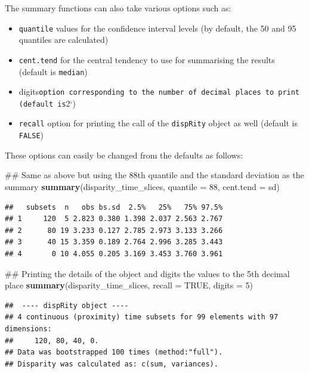 \documentclass[]{book}
\newenvironment{Shaded}{\begin{snugshade}}{\end{snugshade}}
\newcommand{\KeywordTok}[1]{\textcolor[rgb]{0.13,0.29,0.53}{\textbf{#1}}}
\newcommand{\DataTypeTok}[1]{\textcolor[rgb]{0.13,0.29,0.53}{#1}}
\newcommand{\DecValTok}[1]{\textcolor[rgb]{0.00,0.00,0.81}{#1}}
\newcommand{\OtherTok}[1]{\textcolor[rgb]{0.56,0.35,0.01}{#1}}
\newcommand{\NormalTok}[1]{#1}
\providecommand{\tightlist}{%
  \setlength{\itemsep}{0pt}\setlength{\parskip}{0pt}}
\theoremstyle{definition}
\theoremstyle{definition}
\theoremstyle{remark}
\begin{document}
The summary functions can also take various options such as:

\begin{itemize}
\tightlist
\item
  \texttt{quantile} values for the confidence interval levels (by
  default, the 50 and 95 quantiles are calculated)
\item
  \texttt{cent.tend} for the central tendency to use for summarising the
  results (default is \texttt{median})
\item
  digits\texttt{option\ corresponding\ to\ the\ number\ of\ decimal\ places\ to\ print\ (default\ is}2`)
\item
  \texttt{recall} option for printing the call of the \texttt{dispRity}
  object as well (default is \texttt{FALSE})
\end{itemize}

These options can easily be changed from the defaults as follows:

\begin{Shaded}
\begin{Highlighting}[]
\NormalTok{## Same as above but using the 88th quantile and the standard deviation as the summary }
\KeywordTok{summary}\NormalTok{(disparity_time_slices, }\DataTypeTok{quantile =} \DecValTok{88}\NormalTok{, }\DataTypeTok{cent.tend =}\NormalTok{ sd)}
\end{Highlighting}
\end{Shaded}

\begin{verbatim}
##   subsets  n   obs bs.sd  2.5%   25%   75% 97.5%
## 1     120  5 2.823 0.380 1.398 2.037 2.563 2.767
## 2      80 19 3.233 0.127 2.785 2.973 3.133 3.266
## 3      40 15 3.359 0.189 2.764 2.996 3.285 3.443
## 4       0 10 4.055 0.205 3.169 3.453 3.760 3.961
\end{verbatim}

\begin{Shaded}
\begin{Highlighting}[]
\NormalTok{## Printing the details of the object and digits the values to the 5th decimal place}
\KeywordTok{summary}\NormalTok{(disparity_time_slices, }\DataTypeTok{recall =} \OtherTok{TRUE}\NormalTok{, }\DataTypeTok{digits =} \DecValTok{5}\NormalTok{)}
\end{Highlighting}
\end{Shaded}

\begin{verbatim}
##  ---- dispRity object ---- 
## 4 continuous (proximity) time subsets for 99 elements with 97 dimensions:
##     120, 80, 40, 0.
## Data was bootstrapped 100 times (method:"full").
## Disparity was calculated as: c(sum, variances).
\end{verbatim}
\end{document}
